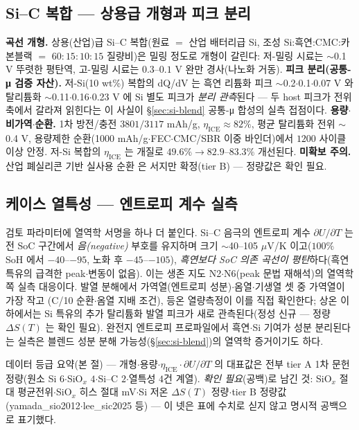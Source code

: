 \subsection{Si--C 복합 --- 상용급 개형과 피크 분리}\label{ssec:si-sic}
\textbf{곡선 개형.} 상용(산업)급 Si--C 복합(원료 $=$ 산업 배터리급 Si, 조성 Si:흑연:CMC:카본블랙 $=$
$60{:}15{:}10{:}15$ 질량비)은 밀링 정도로 개형이 갈린다: 저-밀링 시료는 $\sim$0.1 V 뚜렷한 평탄역, 고-밀링
시료는 $0.3$--$0.1$ V 완만 경사(나노화 거동)\cite{andersen_sic2019}. \textbf{피크 분리(공통-μ 검증
자산).} 저-Si(10 wt\%) 복합의 dQ/dV 는 흑연 리튬화 피크 $\sim$0.2$\cdot$0.1$\cdot$0.07 V 와 탈리튬화
$\sim$0.11$\cdot$0.16$\cdot$0.23 V 에 Si 별도 피크가 \emph{분리 관측}된다\cite{naboka_sic2021} --- 두 host
피크가 전위축에서 갈라져 읽힌다는 이 사실이 \S\ref{sec:si-blend} 공통-μ 합성의 실측 접점이다.
\textbf{용량$\cdot$비가역$\cdot$순환.} 1차 방전/충전 $3801/3117$ mAh/g, $\eta_\mathrm{ICE}\approx82\%$,
평균 탈리튬화 전위 $\sim$0.4 V, 용량제한 순환(1000 mAh/g$\cdot$FEC$\cdot$CMC/SBR 이중 바인더)에서 $1200$
사이클 이상 안정\cite{andersen_sic2019}. 저-Si 복합의 $\eta_\mathrm{ICE}$ 는 개질로 $49.6\%\to82.9$--$83.3\%$
개선된다\cite{naboka_sic2021}. \textbf{미확보 주의.} 산업 폐실리콘 기반 실사용 순환\cite{lee_sic2025} 은
서지만 확정(tier B) --- 정량값은 확인 필요.

\subsection{케이스 열특성 --- 엔트로피 계수 실측}\label{ssec:si-thermal}
검토 파라미터에 열역학 서명을 하나 더 붙인다. Si--C 음극의 엔트로피 계수 $\partial U/\partial T$ 는 전 SoC
구간에서 \emph{음(negative)} 부호를 유지하며 크기 $\sim$40--105 $\mu$V/K 이고($100\%$ SoH 에서
$-40$--$-95$, 노화 후 $-45$--$-105$), \emph{흑연보다 SoC 의존 곡선이 평탄}하다(흑연 특유의 급격한
peak$\cdot$변동이 없음)\cite{bohm_entropy2024}. 이는 생존 지도 N2$\cdot$N6(peak 문법 재해석)의 열역학
쪽 실측 대응이다. 발열 분해에서 가역열(엔트로피 성분)$\cdot$옴열$\cdot$기생열 셋 중 가역열이 가장 작고
(C/10 순환$\cdot$옴열 지배 조건), 등온 열량측정이
이를 직접 확인한다\cite{arnot_calorimetry2021}; 상온 이하에서는 Si 특유의 추가 탈리튬화 발열 피크가 새로
관측된다\cite{bohm_thermal2025}(정성 신규 --- 정량 $\Delta S(T)$ 는 확인 필요). 완전지 엔트로피
프로파일에서 흑연$\cdot$Si 기여가 성분 분리된다는 실측\cite{wojtala_entropy2022}은 블렌드 성분 분해
가능성(\S\ref{sec:si-blend})의 열역학 증거이기도 하다.
\begin{srcbox}
데이터 등급 요약(본 절) --- 개형$\cdot$용량$\cdot\eta_\mathrm{ICE}\cdot\partial U/\partial T$ 의 대표값은
전부 tier A 1차 문헌 정량(원소 Si $6$$\cdot$SiO$_x$ $4$$\cdot$Si--C $2$$\cdot$열특성 $4$건 계열). \emph{확인
필요}(공백)로 남긴 것: SiO$_x$ 절대 평균전위$\cdot$SiO$_x$ 히스 절대 mV$\cdot$Si 저온 $\Delta S(T)$
정량$\cdot$tier B 정량값(yamada\_sio2012$\cdot$lee\_sic2025 등) --- 이 넷은 표에 수치로 싣지 않고 명시적
공백으로 표기했다.
\end{srcbox}

